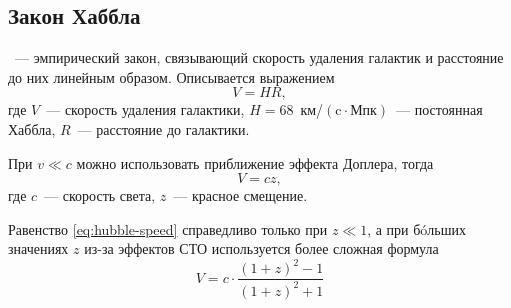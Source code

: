 \subsection{Закон Хаббла}
~--- эмпирический закон, связывающий скорость удаления галактик и расстояние до них линейным образом. Описывается выражением \begin{equation}
V = H R,
\end{equation}
где $V$~--- скорость удаления галактики, $H=68$~км/$(\text{c} \cdot \text{Мпк})$~--- постоянная Хаббла, $R$~--- расстояние до галактики. 

При $v \ll c$ можно использовать приближение эффекта Доплера, тогда
\begin{equation}
V = c z,
\label{eq:hubble-speed}
\end{equation}
где $c$~--- скорость света, $z$~--- красное смещение.

Равенство \eqref{eq:hubble-speed} справедливо только при $z \ll 1$, а при б\'{o}льших значениях $z$ из-за эффектов СТО используется более сложная формула \begin{equation}
V = c \cdot \frac{(1 + z)^2 - 1}{(1 + z)^2 + 1}
\end{equation}